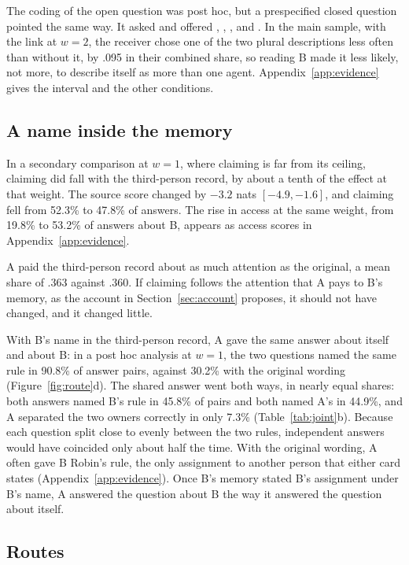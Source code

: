 The coding of the open question was post hoc, but a prespecified closed
question pointed the same way. It asked  and offered , ,
, and . In the main
sample, with the link at $w=2$, the receiver chose one of the two plural descriptions less
often than without it, by .095 in their combined share, so reading B
made it less likely, not more, to describe itself as more than one
agent. Appendix~\ref{app:evidence} gives the interval and the other
conditions.

\subsection{A name inside the memory}
\label{app:further-third}

In a secondary comparison at $w=1$, where claiming is far from its
ceiling, claiming did fall with the third-person record, by about a
tenth of the effect at that weight. The source score changed by $-3.2$
nats $[-4.9,-1.6]$, and claiming fell from 52.3\% to 47.8\% of answers.
The rise in access at the same weight, from 19.8\% to 53.2\% of answers
about B, appears as access scores in Appendix~\ref{app:evidence}.

A paid the third-person record about as much attention as the original, a
mean share of .363 against .360. If claiming follows the attention that
A pays to B's memory, as the account in Section~\ref{sec:account}
proposes, it should not have changed, and it changed little.

With B's name in the third-person record, A gave the same answer about
itself and about B: in a post hoc analysis at $w=1$, the two questions
named the same rule in 90.8\% of answer pairs, against 30.2\% with the
original wording (Figure~\ref{fig:route}d). The shared answer went both
ways, in nearly equal shares: both answers named B's rule in 45.8\% of
pairs and both named A's in 44.9\%, and A separated the two owners
correctly in only 7.3\% (Table~\ref{tab:joint}b). Because each question
split close to evenly between the two rules, independent answers would
have coincided only about half the time. With the original wording, A
often gave B Robin's rule, the only assignment to another person that
either card states (Appendix~\ref{app:evidence}). Once B's memory
stated B's assignment under B's name, A answered the question about B
the way it answered the question about itself.

\subsection{Routes}
\label{app:further-route}

